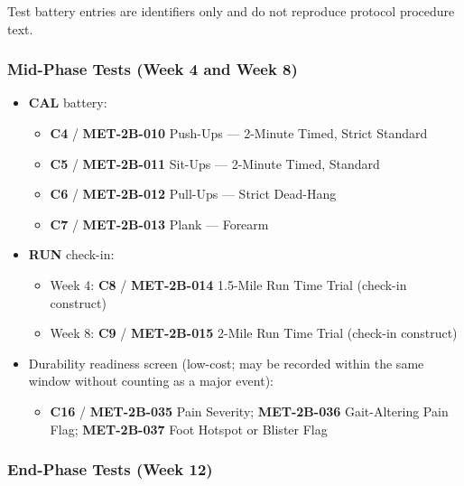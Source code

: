 \documentclass[10pt]{article}
\begin{document}
Test battery entries are identifiers only and do not reproduce protocol procedure text.

\subsubsection*{Mid-Phase Tests (Week 4 and Week 8)}

\begin{itemize}
\item \textbf{CAL} battery:
  \begin{itemize}
  \item \textbf{C4} / \textbf{MET-2B-010} Push-Ups — 2-Minute Timed, Strict Standard
  \item \textbf{C5} / \textbf{MET-2B-011} Sit-Ups — 2-Minute Timed, Standard
  \item \textbf{C6} / \textbf{MET-2B-012} Pull-Ups — Strict Dead-Hang
  \item \textbf{C7} / \textbf{MET-2B-013} Plank — Forearm
  \end{itemize}
\item \textbf{RUN} check-in:
  \begin{itemize}
  \item Week 4: \textbf{C8} / \textbf{MET-2B-014} 1.5-Mile Run Time Trial (check-in construct)
  \item Week 8: \textbf{C9} / \textbf{MET-2B-015} 2-Mile Run Time Trial (check-in construct)
  \end{itemize}
\item Durability readiness screen (low-cost; may be recorded within the same window without counting as a major event):
  \begin{itemize}
  \item \textbf{C16} / \textbf{MET-2B-035} Pain Severity; \textbf{MET-2B-036} Gait-Altering Pain Flag; \textbf{MET-2B-037} Foot Hotspot or Blister Flag
  \end{itemize}
\end{itemize}

\subsubsection*{End-Phase Tests (Week 12)}
\end{document}
